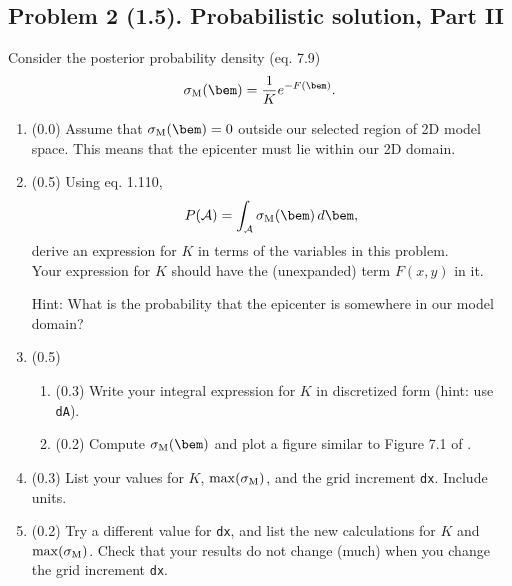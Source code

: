 \documentclass[11pt,titlepage,fleqn]{article}
\begin{document}

\subsection*{Problem 2 (1.5). Probabilistic solution, Part II}

Consider the posterior probability density (eq. 7.9)
%
\begin{equation}
\sigma_{\rm M}(\bem) = \frac{1}{K} e^{-F(\bem)}.
\end{equation}

\begin{enumerate}
\item (0.0) Assume that $\sigma_{\rm M}(\bem) = 0$ outside our selected region of 2D model space. This means that the epicenter must lie within our 2D domain.

\item (0.5) Using eq. 1.110,
%
\begin{equation}
P({\cal A}) = \int_{\cal A} \sigma_{\rm M}(\bem) \, d\bem,
\end{equation}
%
derive an expression for $K$ in terms of the variables in this problem. \\
Your expression for $K$ should have the (unexpanded) term $F(x,y)$ in it.

Hint: What is the probability that the epicenter is somewhere in our model domain?

\item (0.5) 

\begin{enumerate}
\item (0.3) Write your integral expression for $K$ in discretized form (hint: use \verb+dA+).
\item (0.2) Compute $\sigma_{\rm M}(\bem)$ and plot a figure similar to Figure 7.1 of \citet{Tarantola2005}.
\end{enumerate}

\item (0.3) List your values for $K$, $\max(\sigma_{\rm M})$, and the grid increment \verb+dx+. Include units.

\item (0.2) Try a different value for \verb+dx+, and list the new calculations for $K$ and $\max(\sigma_{\rm M})$.  Check that your results do not change (much) when you change the grid increment \verb+dx+.

\label{sigma1}

\end{enumerate}
\end{document}
